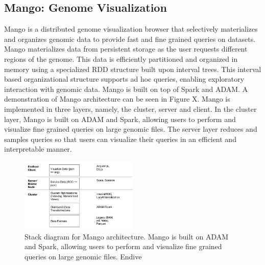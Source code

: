 \documentclass{sig-alternate-05-2015}
\begin{document}
\subsection{Mango: Genome Visualization}
Mango is a distributed genome visualization browser that selectively materializes and organizes genomic data to provide fast and fine grained queries on datasets. Mango materializes data from persistent storage as the user requests different regions of the genome. This data is efficiently partitioned and organized in memory using a specialized RDD structure built upon interval trees. This interval based organizational structure supports ad hoc queries, enabling exploratory interaction with genomic data.  Mango is built on top of Spark and ADAM. A demonstration of Mango architecture can be seen in Figure X. Mango is implemented in three layers, namely, the cluster, server and client. In the cluster layer, Mango is built on ADAM and Spark, allowing users to perform and visualize fine grained queries on large genomic files. The server layer reduces and samples queries so that users can visualize their queries in an efficient and interpretable manner.


\begin{figure}
  \label{fig:mango}
  \includegraphics[width=0.5\textwidth]{figures/mango.png}
  \caption{Stack diagram for Mango architecture. Mango is built on ADAM and Spark, allowing users to perform and visualize fine grained queries on large genomic files.
  Endive}
\end{figure}
\end{document}
